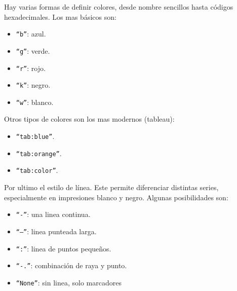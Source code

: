 Hay varias formas de definir colores, desde nombre sencillos hasta códigos hexadecimales. Los mas básicos son:
\begin{itemize}
    \item \texttt{``b''}: azul.
    \item \texttt{``g''}: verde.
    \item \texttt{``r''}: rojo.
    \item \texttt{``k''}: negro.
    \item \texttt{``w''}: blanco.
\end{itemize}

Otros tipos de colores son los mas modernos (tableau):
\begin{itemize}
    \item \texttt{``tab:blue''}.
    \item \texttt{``tab:orange''}.
    \item \texttt{``tab:color''}.
\end{itemize}

Por ultimo el estilo de línea. Este permite diferenciar distintas series, especialmente en impresiones blanco y negro. Algunas posibilidades son:
\begin{itemize}
    \item \texttt{``-''}: una linea continua.
    \item \texttt{``--''}: linea punteada larga.
    \item \texttt{``:''}: linea de puntos pequeños.
    \item \texttt{``-.''}: combinación de raya y punto.
    \item \texttt{``None''}: sin linea, solo marcadores
\end{itemize}




